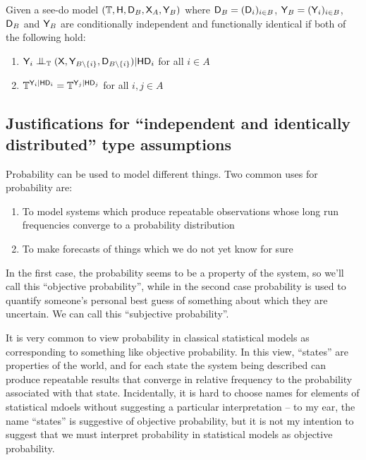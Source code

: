 \begin{definition}
Given a see-do model $(\mathbb{T},\mathsf{H},\mathsf{D}_B,\mathsf{X}_A,\mathsf{Y}_B)$ where $\mathsf{D}_B=(\mathsf{D}_i)_{i\in B}$, $\mathsf{Y}_B=(\mathsf{Y}_i)_{i\in B}$, $\mathsf{D}_B$ and $\mathsf{Y}_B$ are conditionally independent and functionally identical if both of the following hold:
\begin{enumerate}
    \item $\RV{Y}_i\CI_{\kernel{T}} (\RV{X},\RV{Y}_{B\setminus \{i\}},\RV{D}_{B\setminus \{i\}})|\RV{H}\RV{D}_i$ for all $i\in A$
    \item $\mathbb{T}^{\mathsf{Y}_i|\mathsf{H}\mathsf{D}_i} = \mathbb{T}^{\mathsf{Y}_j|\mathsf{H}\mathsf{D}_j}$ for all $i,j\in A$
\end{enumerate}
\end{definition}

\subsection{Justifications for ``independent and identically distributed'' type assumptions}

Probability can be used to model different things. Two common uses for probability are:

\begin{enumerate}
    \item To model systems which produce repeatable observations whose long run frequencies converge to a probability distribution
    \item To make forecasts of things which we do not yet know for sure
\end{enumerate}

In the first case, the probability seems to be a property of the system, so we'll call this ``objective probability'', while in the second case probability is used to quantify someone's personal best guess of something about which they are uncertain. We can call this ``subjective probability''.

It is very common to view probability in classical statistical models as corresponding to something like objective probability. In this view, ``states'' are properties of the world, and for each state the system being described can produce repeatable results that converge in relative frequency to the probability associated with that state. Incidentally, it is hard to choose names for elements of statistical mdoels without suggesting a particular interpretation -- to my ear, the name ``states'' is suggestive of objective probability, but it is not my intention to suggest that we must interpret probability in statistical models as objective probability.

